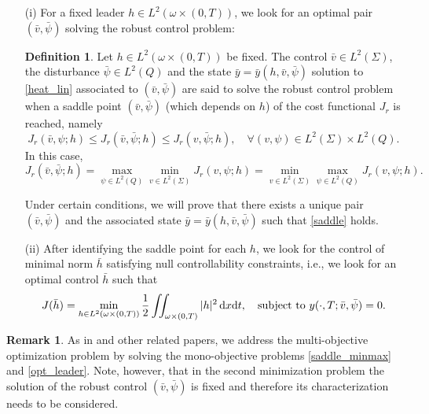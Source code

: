 \documentclass{dcds-bOF}
\theoremstyle{definition}
\newtheorem{definition}[theorem]{Definition}
\newtheorem{remark}{Remark}
\def\dx{\,\textnormal{d}x}
\def\dt{\textnormal{d}t}
\begin{document}
\begin{enumerate}
\item[(i)] For a fixed leader $h\in L^2(\omega\times(0,T))$, we look for an optimal pair $(\bar v,\bar \psi)$ solving the robust control problem:
%
\begin{definition}\label{defi_rob}
Let $h\in L^2(\omega\times(0,T))$ be fixed. The control $\bar v\in L^2(\Sigma)$, the disturbance $\bar \psi\in L^2(Q)$ and the state $\bar y=\bar y(h,\bar v,\bar \psi)$ solution to \eqref{heat_lin} associated to $(\bar v,\bar \psi)$ are said to solve the robust control problem when a saddle point $(\bar v,\bar \psi)$ (which depends on $h$) of the cost functional $J_r$ is reached, namely
%
\begin{equation}\label{saddle}
J_r(\bar v,\psi;h)\leq J_r(\bar v,\bar \psi;h)\leq J_r(v,\bar \psi;h), \quad \forall (v,\psi)\in L^2(\Sigma)\times L^2(Q).
\end{equation}
%
In this case,
%
\begin{equation}\label{saddle_minmax}
J_r(\bar v,\bar \psi;h)=\max_{\psi\in L^2(Q)}\min_{v\in L^2(\Sigma)}J_r(v,\psi;h)=\min_{v\in L^2(\Sigma)}\max_{\psi\in L^2(Q)}J_r(v,\psi;h).
\end{equation}
%
\end{definition}
%
Under certain conditions, we will prove that there exists a unique pair $(\bar v,\bar \psi)$ and the associated state $\bar y=\bar y(h,\bar v,\bar\psi)$ such that \eqref{saddle} holds.
%
\item[(ii)] After identifying the saddle point for each $h$, we look for the control of minimal norm $\bar h$ satisfying null controllability constraints, i.e., we look for an optimal control $\bar h$  such that
%
\begin{equation}\label{opt_leader}
J(\bar h)=\min_{h\in L^2(\omega\times(0,T))}\frac{1}{2}\iint_{\omega\times(0,T)}|h|^2\dx\dt, \quad \text{subject to } y(\cdot,T;\bar v,\bar \psi)=0.
\end{equation}
\end{enumerate}

\begin{remark}
As in \cite{LionsSta} and other related papers, we address the multi-objective optimization problem by solving the mono-objective problems \eqref{saddle_minmax} and \eqref{opt_leader}. Note, however, that in the second minimization problem the solution of the robust control $(\bar v, \bar \psi)$ is fixed and therefore its characterization needs to be considered.
\end{remark}
\end{document}
